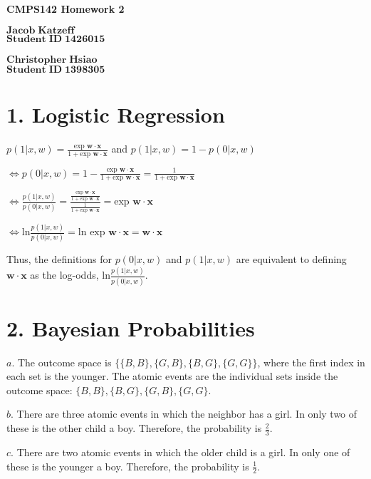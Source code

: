 \documentclass[11pt]{article}
\begin{document}
\begin{center}
{\bf\Large CMPS142 Homework 2}
\end{center}
\noindent $\mathbf{Jacob\;Katzeff}$\\
\noindent $\mathbf{Student\;ID\;1426015}$\\
\\
\noindent $\mathbf{Christopher\;Hsiao}$\\
\noindent $\mathbf{Student\;ID\;1398305}$\\

\section*{1. Logistic Regression}

\noindent $p(1 | x,w)=\frac{\text{exp }\mathbf{w}\cdot \mathbf{x}}{1+\text{exp }\mathbf{w}\cdot \mathbf{x}}$ and $p(1 | x,w)=1-p(0|x,w)$

\noindent $\iff p(0 | x,w)=1-\frac{\text{exp }\mathbf{w}\cdot \mathbf{x}}{1+\text{exp }\mathbf{w}\cdot \mathbf{x}}=\frac{1}{1+\text{exp }\mathbf{w}\cdot \mathbf{x}}$

\noindent $\iff \frac{p(1 | x,w)}{p(0 | x,w)}=\frac{\frac{\text{exp }\mathbf{w}\cdot \mathbf{x}}{1+\text{exp }\mathbf{w}\cdot \mathbf{x}}}{\frac{1}{1+\text{exp }\mathbf{w}\cdot \mathbf{x}}}=\text{exp }\mathbf{w}\cdot\mathbf{x}$

\noindent $\iff \text{ln}\frac{p(1 | x,w)}{p(0 | x,w)}=\text{ln }\text{exp }\mathbf{w}\cdot\mathbf{x}=\mathbf{w}\cdot\mathbf{x}$

\noindent Thus, the definitions for $p(0 | x,w)$ and $p(1 | x,w)$ are equivalent to defining $\mathbf{w}\cdot\mathbf{x}$ as the log-odds, $\text{ln}\frac{p(1 | x,w)}{p(0 | x,w)}$.

\section*{2. Bayesian Probabilities}

\noindent $a.$ The outcome space is $\{\{B,B\},\{G,B\},\{B,G\},\{G,G\}\}$, where the first index in each set is the younger. The atomic events are the individual sets inside the outcome space: $\{B,B\}, \{B,G\},\{G,B\},\{G,G\}$.

\noindent $b.$ There are three atomic events in which the neighbor has a girl. In only two of these is the other child a boy. Therefore, the probability is $\frac{2}{3}$.

\noindent $c.$ There are two atomic events in which the older child is a girl. In only one of these is the younger a boy. Therefore, the probability is $\frac{1}{2}$.
\end{document}
